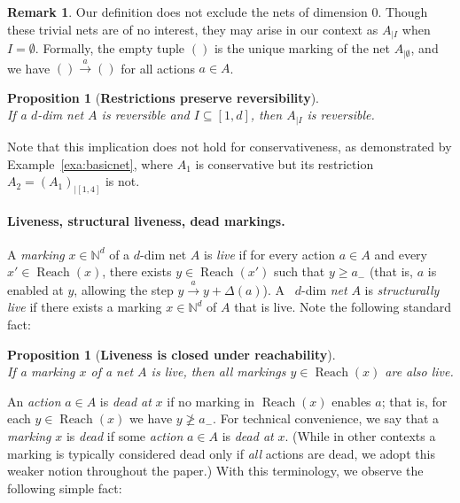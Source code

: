 \documentclass[11pt,a4paper]{amsart}
\DeclareMathOperator{\Reach}{Reach}
\newcommand{\step}[1]{\mathrel{\xrightarrow{#1}}}
\newcommand{\Nat}{\mathbb{N}}
\newcommand{\restr}[1]{_{|{#1}}}
\newcommand{\setN}{\Nat}
\theoremstyle{plain}
\newtheorem{prop}[thm]{Proposition}
\theoremstyle{definition}
\newtheorem{rem}[thm]{Remark}
\theoremstyle{defC}
\theoremstyle{thmC}
\begin{document}
\begin{rem}\label{rem:dimzero}
Our definition does not exclude the nets of dimension $0$. Though these
trivial nets are of no interest, they may arise in our context as
$A\restr{I}$ when $I=\emptyset$. Formally, the empty tuple
	$()$ is the unique marking of the net $A\restr{\emptyset}$,
	and we have $()\step{a}()$ for all actions $a\in A$.
\end{rem}	

\begin{prop}[\textbf{Restrictions preserve reversibility}]\label{prop:restrpresrev}
\hfill\\
If a $d$-dim net $A$ is reversible and $I\subseteq[1,d]$, then 
$A\restr{I}$ is reversible.
\end{prop}

\noindent
Note that this implication does not hold for
conservativeness, as demonstrated by Example~\ref{exa:basicnet}, where
$A_1$ is conservative but its restriction $A_2=(A_1)\restr{[1,4]}$ is not.


\paragraph{Liveness, structural liveness, dead markings.}
A \emph{marking} $x\in\setN^d$ of a $d$-dim net $A$ is \emph{live} if
for every action $a\in A$ and every $x'\in \Reach(x)$, 
 there exists $y\in \Reach(x')$ such that
 $y\geq a_-$ (that is, $a$ is enabled at $y$, allowing the step
 $y\step{a}y+\Delta(a)$).  A~ $d$-dim \emph{net} $A$ is \emph{structurally
 live} if there exists a marking $x\in\setN^d$ of $A$ that is live.
 Note the following standard fact:

\begin{prop}[\textbf{Liveness is closed under
	reachability}]\label{prop:liveunderreach}
\hfill\\	
If a marking $x$ of a net $A$ is live, then all
 markings $y\in\Reach(x)$ are also live.
\end{prop}

\noindent
An \emph{action} $a\in A$ is \emph{dead at} $x$ if 
no marking in $\Reach(x)$ enables
$a$; that is, for each $y\in
\Reach(x)$ we have $y\ngeq a_-$.
For technical convenience, we say that
a \emph{marking} $x$ 
is \emph{dead} if some \emph{action} $a\in A$ is \emph{dead at} $x$.
(While in other contexts a marking is typically considered dead only if
\emph{all} actions are
dead, we adopt this weaker notion throughout the paper.) 
With this terminology, we observe the following simple fact:
\end{document}
